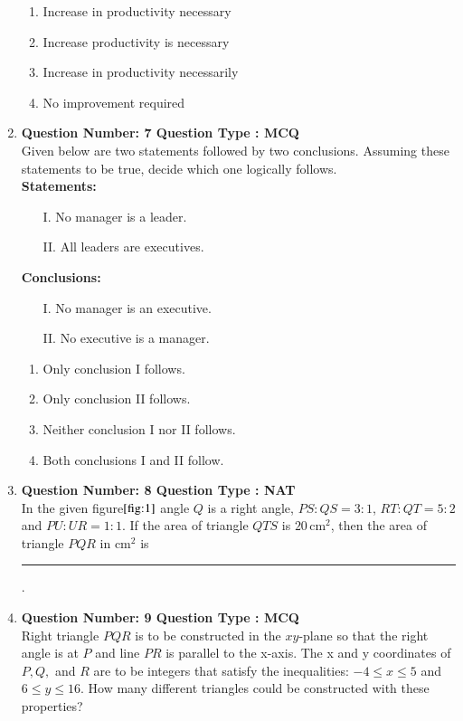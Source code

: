 \documentclass[journal,,12pt,onecolumn]{IEEEtran}
\theoremstyle{remark}
\begin{document}
\begin{enumerate}
\begin{enumerate}
    \item Increase in productivity necessary
    \item Increase productivity is necessary
    \item Increase in productivity necessarily
    \item No improvement required
\end{enumerate}
\bigskip
\item \textbf{Question Number: 7 Question Type : MCQ}\\
Given below are two statements followed by two conclusions. Assuming these statements to be true, decide which one logically follows. \\

\textbf{Statements:}
\begin{enumerate}
    \item[I.] No manager is a leader.
    \item[II.] All leaders are executives.
\end{enumerate}

\textbf{Conclusions:}
\begin{enumerate}
    \item[I.] No manager is an executive.
    \item[II.] No executive is a manager.
\end{enumerate}

\begin{enumerate}
    \item Only conclusion I follows.
    \item Only conclusion II follows.
    \item Neither conclusion I nor II follows.
    \item Both conclusions I and II follow.
\end{enumerate}
\bigskip
\item \textbf{Question Number: 8 Question Type : NAT}\\
In the given figure$\ref{fig:1}$ angle $ Q $ is a right angle, $ PS:QS = 3:1 $, $ RT:QT = 5:2 $ and $ PU:UR = 1:1 $. If the area of triangle $ QTS $ is $ 20 \, \text{cm}^2 $, then the area of triangle $ PQR $ in $ \text{cm}^2 $ is \rule{1cm}{0.15mm}.
\begin{figure}[H]
    \centering
    
    \caption{}
    \label{fig:1}
\end{figure}
\bigskip
\item \textbf{Question Number: 9 Question Type : MCQ}\\
Right triangle $ PQR $ is to be constructed in the $ xy $-plane so that the right angle is at $ P $ and line $ PR $ is parallel to the x-axis. The x and y coordinates of $ P, Q, $ and $ R $ are to be integers that satisfy the inequalities: $ -4 \leq x \leq 5 $ and $ 6 \leq y \leq 16 $. How many different triangles could be constructed with these properties? \\


\end{enumerate}
\end{document}
